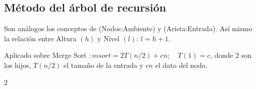 \documentclass[tikz,11pt,fleqn]{book} %
\begin{document}
\subsection{Método del árbol de recursión}
\begin{example}
    Son análogos los conceptos de (Nodos:Ambiente) y (Arista:Entrada). Así mismo la relación entre Altura $(h)$ y Nivel $(l)$: $l=h+1$. 
    
    Aplicado sobre Merge Sort $:msort=2T(n/2)+cn;\quad T(1)=c$, donde $2$ son los hijos, $T(n/2)$ el tamaño de la entrada y $cn$ el dato del nodo.
    




    \begin{multicols}{2}



\end{multicols}
\end{example}
\end{document}
